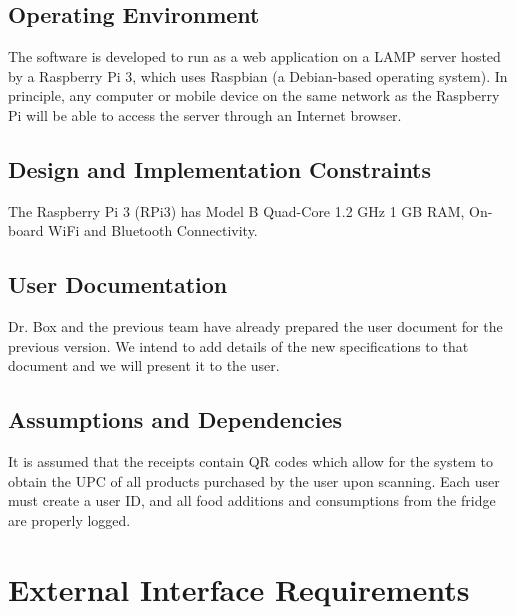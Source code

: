 \subsection{Operating Environment}
The software is developed to run as a web application on a LAMP server hosted by a Raspberry Pi 3, which uses Raspbian (a Debian-based operating system). In principle, any computer or mobile device on the same network as the Raspberry Pi will be able to access the server through an Internet browser. 

\subsection{Design and Implementation Constraints}
The Raspberry Pi 3 (RPi3) has Model B Quad-Core 1.2 GHz 1 GB RAM, On-board WiFi and Bluetooth Connectivity.

\subsection{User Documentation}
Dr. Box and the previous team have already prepared the user document for the previous version. We intend to add details of the new specifications to that document and we will present it to the user.

\subsection{Assumptions and Dependencies}
It is assumed that the receipts contain QR codes which allow for the system to obtain the UPC of all products purchased by the user upon scanning. Each user must create a user ID, and all food additions and consumptions from the fridge are properly logged. 

\section{External Interface Requirements}


